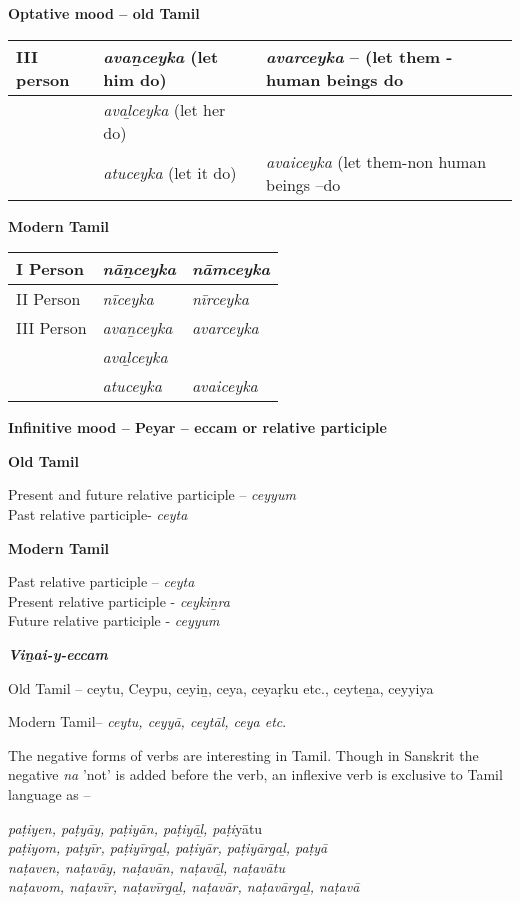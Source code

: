 \textbf{Optative mood – old Tamil}

\begin{longtable}{|l|l|p{3.8cm}|}
\hline
III person & \textit{avaṉceyka} (let him do) & \textit{avarceyka} – (let them - human beings do \\
\hline
 & \textit{avaḻceyka} (let her do) &  \tabularnewline
\hline
 & \textit{atuceyka} (let it do) & \textit{avaiceyka}  (let them-non human beings –do \tabularnewline
\hline
\end{longtable}

\textbf{Modern Tamil}

\begin{longtable}{|l|l|l|}
\hline
I Person & \textit{nāṉceyka} & \textit{nāmceyka} \\
\hline
II Person & \textit{nīceyka} & \textit{nīrceyka} \tabularnewline
\hline
III Person & \textit{avaṉceyka} & \textit{avarceyka} \tabularnewline
\hline
 & \textit{avaḻceyka} &  \tabularnewline
\hline
 & \textit{atuceyka} & \textit{avaiceyka} \tabularnewline
\hline
\end{longtable}

\textbf{Infinitive mood – Peyar – eccam or relative participle}

\vskip 3pt

\textbf{Old Tamil}

Present and future relative participle – \textit{ceyyum}\\ Past relative participle- \textit{ceyta}

\vskip 3pt

\textbf{Modern Tamil}

Past relative participle – \textit{ceyta}\\ Present relative participle - \textit{ceykiṉra}\\ Future relative participle - \textit{ceyyum}

\vskip 3pt

\textbf{\textit{Viṉai-y-eccam}}

Old Tamil – ceytu, Ceypu, ceyiṉ, ceya, ceyaṛku etc., ceyteṉa, ceyyiya

Modern Tamil– \textit{ceytu, ceyyā, ceytāl, ceya etc}.

The negative forms of verbs are interesting in Tamil. Though in Sanskrit the negative \textit{na} 'not' is added before the verb, an inflexive verb is exclusive to Tamil language as –

\begin{myquote}
\textit{paṭiyen, paṭyāy, paṭiyān, paṭiyāḻ, paṭi}yātu\\\textit{paṭiyom, paṭyīr, paṭiyīrgaḻ, paṭiyār, paṭiyārgaḻ, paṭyā}\\\textit{naṭaven, naṭavāy, naṭavān, naṭavāḻ, naṭavātu}\\\textit{naṭavom, naṭavīr, naṭavīrgaḻ, naṭavār, naṭavārgaḻ, naṭavā}
\end{myquote}

